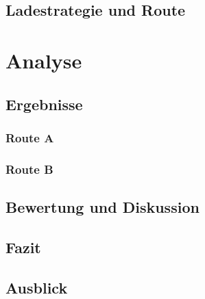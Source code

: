 \documentclass[twoside]{scrreprt}
\begin{document}
\section{Ladestrategie und Route}

\chapter{Analyse}
\section{Ergebnisse}
\subsection{Route A}
\subsection{Route B}
\section{Bewertung und Diskussion}
\section{Fazit}
\section{Ausblick}




 
\end{document}
